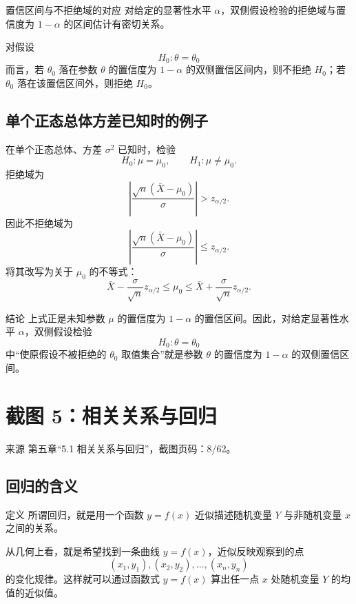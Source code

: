 \documentclass[UTF8,zihao=-4,fontset=fandol]{ctexart}
\begin{document}
\begin{keybox}{置信区间与不拒绝域的对应}
对给定的显著性水平 $\alpha$，双侧假设检验的拒绝域与置信度为 $1-\alpha$ 的区间估计有密切关系。

对假设
\[
H_0:\theta=\theta_0
\]
而言，若 $\theta_0$ 落在参数 $\theta$ 的置信度为 $1-\alpha$ 的双侧置信区间内，则不拒绝 $H_0$；若 $\theta_0$ 落在该置信区间外，则拒绝 $H_0$。
\end{keybox}

\subsection{单个正态总体方差已知时的例子}

在单个正态总体、方差 $\sigma^2$ 已知时，检验
\[
H_0:\mu=\mu_0,\qquad H_1:\mu\ne\mu_0.
\]
拒绝域为
\[
\left|
\frac{\sqrt{n}(\bar{X}-\mu_0)}{\sigma}
\right|>z_{\alpha/2}.
\]
因此不拒绝域为
\[
\left|
\frac{\sqrt{n}(\bar{X}-\mu_0)}{\sigma}
\right|\le z_{\alpha/2}.
\]
将其改写为关于 $\mu_0$ 的不等式：
\[
\bar{X}-\frac{\sigma}{\sqrt{n}}z_{\alpha/2}
\le
\mu_0
\le
\bar{X}+\frac{\sigma}{\sqrt{n}}z_{\alpha/2}.
\]

\begin{methodbox}{结论}
上式正是未知参数 $\mu$ 的置信度为 $1-\alpha$ 的置信区间。因此，对给定显著性水平 $\alpha$，双侧假设检验
\[
H_0:\theta=\theta_0
\]
中“使原假设不被拒绝的 $\theta_0$ 取值集合”就是参数 $\theta$ 的置信度为 $1-\alpha$ 的双侧置信区间。
\end{methodbox}

\section{截图 5：相关关系与回归}

\begin{sourcebox}{来源}
第五章“5.1 相关关系与回归”，截图页码：8/62。
\end{sourcebox}

\subsection{回归的含义}

\begin{keybox}{定义}
所谓回归，就是用一个函数 $y=f(x)$ 近似描述随机变量 $Y$ 与非随机变量 $x$ 之间的关系。

从几何上看，就是希望找到一条曲线 $y=f(x)$，近似反映观察到的点
\[
(x_1,y_1),(x_2,y_2),\ldots,(x_n,y_n)
\]
的变化规律。这样就可以通过函数式 $y=f(x)$ 算出任一点 $x$ 处随机变量 $Y$ 的均值的近似值。
\end{keybox}
\end{document}
